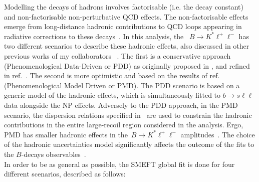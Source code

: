 Modelling the decays of hadrons involves factorisable (i.e. the decay constant) and non-factorisable non-perturbative QCD effects. The non-factorisable effects emerge from long-distance hadronic contributions to QCD loops appearing in radiative corrections to these decays~\cite{Khodjamirian:2010vf,Jager:2014rwa,Lyon:2014hpa}. In this analysis, the ~$B\to K^*\ell^+\ell^-$ has two different scenarios to describe these hadronic effects, also discussed in other previous works of my collaborators ~\cite{Ciuchini:2016weo,Ciuchini:2017mik,Ciuchini:2017gva,Ciuchini:2018xll,Ciuchini:2018anp, Ciuchini:2019usw}. The first is a conservative approach (Phenomenological Data-Driven or PDD) as originally proposed in \cite{Ciuchini:2015qxb}, and refined in ref.~\cite{Ciuchini:2018anp}. The second is  more optimistic and  based on the results of ref.~\cite{Khodjamirian:2010vf} (Phenomenological Model Driven or PMD). The PDD scenario is based on a generic model of the hadronic effects, which is simultaneously fitted to $b \to s \ell \ell$ data alongside the NP effects. Adversely to the PDD approach, in the PMD scenario, the dispersion relations specified in~\cite{Khodjamirian:2010vf} are used to constrain the hadronic contributions in the entire large-recoil region considered in the analysis. Ergo, PMD has smaller hadronic effects in the~$B\to K^*\ell^+\ell^-$ amplitudes~\cite{Ciuchini:2016weo}. The choice of the hadronic uncertainties model significantly affects the outcome of the fits to the $B$-decays observables~\cite{Ciuchini:2019usw}. \\ In order to be as general as possible, the SMEFT global fit is done for four different scenarios, described as follows:
